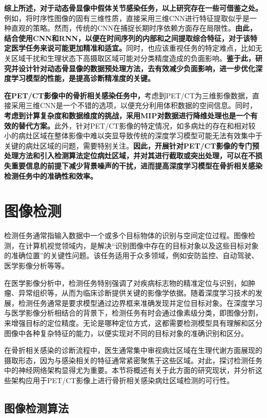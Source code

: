 \textbf{综上所述，对于动态骨显像中假体关节感染任务，以上研究存在一些可借鉴之处。}例如，将时序性图像的固有三维性质，直接采用三维CNN进行特征提取似乎是一种直观的策略。然而，传统的CNN在捕捉长期时序依赖方面存在局限性。\textbf{由此，结合使用CNN和RNN，以便在时间序列的内部和之间提取综合特征，对于该特定医学任务来说可能更加精准和适宜。}同时，也应该重视任务的特定难点，比如无关区域干扰和生理状态下高摄取区域可能对分类精度造成的负面影响。\textbf{鉴于此，研究并设计针对动态骨显像的数据预处理方法，去有效减少负面影响，进一步优化深度学习模型的性能，是提高诊断精准度的关键。}

\textbf{在PET/CT影像中的骨折相关感染任务中，}考虑到PET/CT为三维影像数据，直接采用三维CNN是一个不错的选项，以便充分利用体积数据的空间信息。同时，\textbf{考虑到计算复杂度和数据维度的挑战，采用MIP对数据进行降维处理也是一个有效的替代方案。}此外，针对PET/CT影像的特定情况，如多病灶的存在和相对较小的病灶区域在整体影像中难以突显导致传统的深度学习模型可能无法有效集中于关键的病灶区域的问题，需要特别关注。\textbf{因此，开展针对PET/CT影像的专门预处理方法和引入检测算法定位病灶区域，并对其进行截取或突出处理，可以在不损失重要信息的前提下减少背景噪声的干扰，进而提高深度学习模型在骨折相关感染检测任务中的准确性和效率。}

\section{图像检测}

检测任务通常指输入数据中一个或多个目标物体的识别与空间定位过程。图像检测，在计算机视觉领域内，是解决“识别图像中存在的目标对象以及这些目标对象的准确位置”的关键性问题。该任务适用于众多领域，例如安防监控、自动驾驶、医学影像分析等等。

在医学影像分析中，检测任务特别强调了对疾病标志物的精准定位与识别，如肿瘤、异常组织等，从而为临床诊断提供关键的影像学依据。随着深度学习技术的发展，检测任务通常是要求模型通过边界框来准确发现并定位目标对象。在深度学习与医学影像分析相结合的背景下，检测任务有时会通过像素级分类，即图像分割，来增强目标的定位精度。无论是哪种定位方式，这都需要检测模型具有理解和区分图像中各种复杂特征的能力，以便实现对不同的目标对象的准确识别和区分。

在骨折相关感染的诊断流程中，医生通常集中审视病灶区域在生理代谢方面展现的摄取形态，因为与感染相关的特征通常紧密聚焦于这些区域。对此，探讨检测任务中的神经网络架构显得尤为重要。本节将概述有关于此方面的研究现状，并分析这些架构应用于PET/CT影像上进行骨折相关感染病灶区域检测的可行性。

\subsection{图像检测算法}

